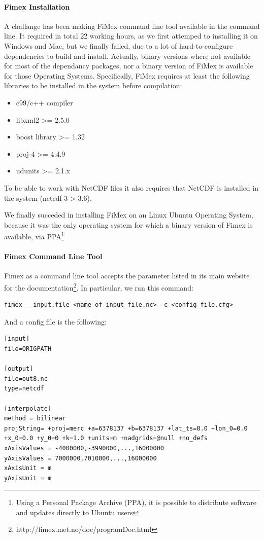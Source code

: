 \documentclass[11pt,a4paper,titlepage,oneside]{report}
\begin{document}
\paragraph{\gls{Fimex} Installation}
A challange has been making FiMex command line tool available in the command line. It required in total 22 working hours, as we first attemped to installing it on Windows and Mac, but we finally failed, due to a lot of hard-to-configure dependencies to build and install. Actually, binary versions where not available for most of the dependancy packages, nor a binary version of FiMex is available for those Operating Systems.
Specifically, FiMex requires at least the following libraries to be installed in the system before compilation:
\begin{itemize}
\item c99/c++ compiler
\item libxml2 >= 2.5.0
\item boost library >= 1.32
\item proj-4 >= 4.4.9
\item udunits >= 2.1.x
\end{itemize}

To be able to work with NetCDF files it also requires that NetCDF is installed in the system (netcdf-3 > 3.6).

We finally succeded in installing FiMex on an Linux Ubuntu Operating System, because it was the only operating system for which a binary version of \gls{Fimex} is available, via \gls{PPA}\footnote{Using a Personal Package Archive (\gls{PPA}), it is possible to distribute software and updates directly to Ubuntu users}

\paragraph{\gls{Fimex} Command Line Tool}
Fimex as a command line tool accepts the parameter listed in its main website for the documentation\footnote{http://fimex.met.no/doc/programDoc.html}.
In particular, we ran this command:
\begin{lstlisting}
fimex --input.file <name_of_input_file.nc> -c <config_file.cfg>
\end{lstlisting}

And a config file is the following:
\begin{lstlisting}
[input]
file=ORIGPATH

[output]
file=out8.nc
type=netcdf

[interpolate]
method = bilinear
projString= +proj=merc +a=6378137 +b=6378137 +lat_ts=0.0 +lon_0=0.0 +x_0=0.0 +y_0=0 +k=1.0 +units=m +nadgrids=@null +no_defs
xAxisValues = -4000000,-3990000,...,16000000
yAxisValues = 7000000,7010000,...,16000000
xAxisUnit = m
yAxisUnit = m
\end{lstlisting}
\end{document}
